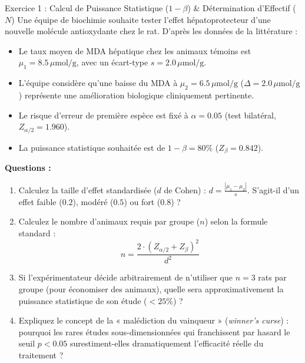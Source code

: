 \documentclass[11pt,a4paper]{article}
\begin{document}

\begin{exercicebox}{Exercice 1 : Calcul de Puissance Statistique ($1-\beta$) \& Détermination d'Effectif ($N$)}
Une équipe de biochimie souhaite tester l'effet hépatoprotecteur d'une nouvelle molécule antioxydante chez le rat.
D'après les données de la littérature :
\begin{itemize}
  \item Le taux moyen de MDA hépatique chez les animaux témoins est $\mu_1 = 8.5\,\mu\text{mol/g}$, avec un écart-type $s = 2.0\,\mu\text{mol/g}$.
  \item L'équipe considère qu'une baisse du MDA à $\mu_2 = 6.5\,\mu\text{mol/g}$ ($\Delta = 2.0\,\mu\text{mol/g}$) représente une amélioration biologique cliniquement pertinente.
  \item Le risque d'erreur de première espèce est fixé à $\alpha = 0.05$ (test bilatéral, $Z_{\alpha/2} = 1.960$).
  \item La puissance statistique souhaitée est de $1 - \beta = 80\%$ ($Z_\beta = 0.842$).
\end{itemize}

\textbf{Questions :}
\begin{enumerate}[label=\textbf{\alph*.}]
  \item Calculez la taille d'effet standardisée ($d$ de Cohen) : $d = \frac{|\mu_1 - \mu_2|}{s}$. S'agit-il d'un effet faible ($0.2$), modéré ($0.5$) ou fort ($0.8$) ?
  \item Calculez le nombre d'animaux requis par groupe ($n$) selon la formule standard :
  \begin{equation*}
    n = \frac{2 \cdot (Z_{\alpha/2} + Z_\beta)^2}{d^2}
  \end{equation*}
  \item Si l'expérimentateur décide arbitrairement de n'utiliser que $n = 3$ rats par groupe (pour économiser des animaux), quelle sera approximativement la puissance statistique de son étude ($< 25\%$) ?
  \item Expliquez le concept de la « malédiction du vainqueur » (\textit{winner's curse}) : pourquoi les rares études sous-dimensionnées qui franchissent par hasard le seuil $p < 0.05$ surestiment-elles dramatiquement l'efficacité réelle du traitement ?
\end{enumerate}
\end{exercicebox}
\end{document}
